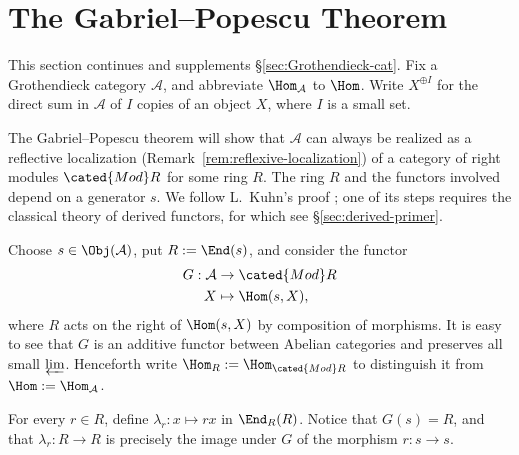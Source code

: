 \section{The Gabriel--Popescu Theorem}\label{sec:GP}
This section continues and supplements \S\ref{sec:Grothendieck-cat}. Fix a Grothendieck category $\mathcal{A}$, and abbreviate $\Hom_{\mathcal{A}}$ to $\Hom$. Write $X^{\oplus I}$ for the direct sum in $\mathcal{A}$ of $I$ copies of an object $X$, where $I$ is a small set.

The Gabriel--Popescu theorem will show that $\mathcal{A}$ can always be realized as a reflective localization (Remark~\ref{rem:reflexive-localization}) of a category of right modules $\cated{Mod}R$ for some ring $R$. The ring $R$ and the functors involved depend on a generator $s$. We follow L.\ Kuhn's proof \cite{Ku94}; one of its steps requires the classical theory of derived functors, for which see \S\ref{sec:derived-primer}.

Choose $s\in\Obj(\mathcal{A})$, put $R:=\End(s)$, and consider the functor
\begin{align*}
	G: \mathcal{A} & \to \cated{Mod}R \\
	X & \mapsto \Hom(s, X),
\end{align*}
where $R$ acts on the right of $\Hom(s,X)$ by composition of morphisms. It is easy to see that $G$ is an additive functor between Abelian categories and preserves all small $\varprojlim$. Henceforth write $\Hom_R:=\Hom_{\cated{Mod}R}$ to distinguish it from $\Hom:=\Hom_{\mathcal{A}}$.

For every $r\in R$, define $\lambda_r:x\mapsto rx$ in $\End_R(R)$. Notice that $G(s)=R$, and that $\lambda_r:R\to R$ is precisely the image under $G$ of the morphism $r:s\to s$.

